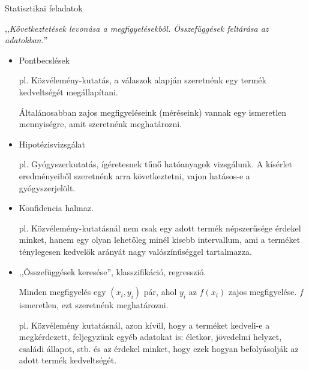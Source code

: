 \documentclass[aspectratio=169,notheorems,9pt,\option]{beamer}
\begin{document}
\begin{frame}{Statisztikai feladatok}

  ,,\textit{Következtetések levonása a megfigyelésekből.
  Összefüggések feltárása az adatokban.}''
  
  \begin{itemize}
    \item Pontbecslések
    
    pl. Közvélemény-kutatás, a válaszok alapján szeretnénk egy termék kedveltségét megállapítani.
    
    Általánosabban zajos megfigyeléseink (méréseink) vannak egy ismeretlen mennyiségre, 
    amit szeretnénk meghatározni.

    \item Hipotézisvizsgálat
    
    pl. Gyógyszerkutatás, ígéretesnek tűnő hatóanyagok vizsgálunk. A kísérlet eredményeiből 
    szeretnénk arra következtetni, vajon hatásos-e a gyógyszerjelölt.

    \item Konfidencia halmaz.
    
    pl. Közvélemény-kutatásnál nem csak egy adott termék népszerűsége érdekel minket, hanem egy olyan
    lehetőleg minél kisebb intervallum, ami a terméket ténylegesen kedvelők arányát nagy valószínűséggel tartalmazza.

    \item ,,Összefüggések keresése'', klasszifikáció, regresszió.
    
    Minden megfigyelés egy $(x_i,y_i)$ pár, ahol $y_i$ az $f(x_i)$ zajos megfigyelése. 
    $f$ ismeretlen, ezt szeretnénk meghatározni.

    pl. Közvélemény kutatásnál, azon kívül, hogy a terméket kedveli-e a megkérdezett, feljegyzünk egyéb adatokat is:
    életkor, jövedelmi helyzet, családi állapot, stb.  és az érdekel minket, hogy ezek 
    hogyan befolyásolják az adott termék kedveltségét.
    
  \end{itemize}
\end{frame}
\end{document}
